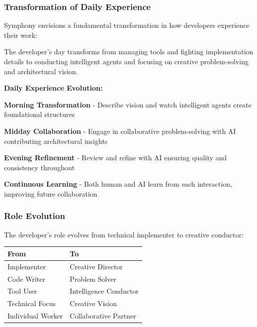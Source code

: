 \subsubsection{Transformation of Daily Experience}

Symphony envisions a fundamental transformation in how developers experience their work:

\begin{successbox}
The developer's day transforms from managing tools and fighting implementation details to conducting intelligent agents and focusing on creative problem-solving and architectural vision.
\end{successbox}

\textbf{Daily Experience Evolution:}

\begin{expandedlist}
    \item \textbf{Morning Transformation} - Describe vision and watch intelligent agents create foundational structures
    
    \item \textbf{Midday Collaboration} - Engage in collaborative problem-solving with AI contributing architectural insights
    
    \item \textbf{Evening Refinement} - Review and refine with AI ensuring quality and consistency throughout
    
    \item \textbf{Continuous Learning} - Both human and AI learn from each interaction, improving future collaboration
\end{expandedlist}

\subsubsection{Role Evolution}

The developer's role evolves from technical implementer to creative conductor:

\begin{center}
\begin{tabular}{@{}ll@{}}
\toprule
\textbf{From} & \textbf{To} \\
\midrule
Implementer & Creative Director \\
Code Writer & Problem Solver \\
Tool User & Intelligence Conductor \\
Technical Focus & Creative Vision \\
Individual Worker & Collaborative Partner \\
\bottomrule
\end{tabular}
\label{tab:role-evolution}
\end{center}

